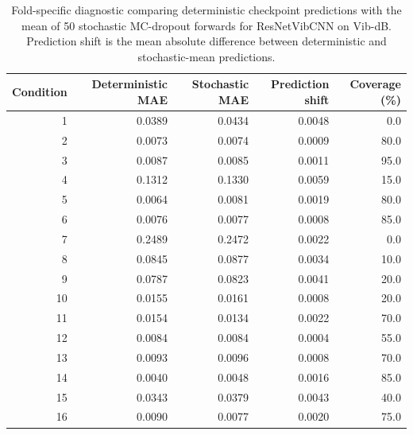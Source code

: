 \begin{table}[htbp]
\centering
\caption{Fold-specific diagnostic comparing deterministic checkpoint
predictions with the mean of 50 stochastic MC-dropout forwards for
ResNetVibCNN on Vib-dB. Prediction shift is the mean absolute difference
between deterministic and stochastic-mean predictions.}
\label{tab:supp-mcdropout-deterministic}
\begin{tabular}{@{}rrrrr@{}}
\toprule
Condition & Deterministic MAE & Stochastic MAE & Prediction shift & Coverage (\%) \\
\midrule
1 & 0.0389 & 0.0434 & 0.0048 & 0.0 \\
2 & 0.0073 & 0.0074 & 0.0009 & 80.0 \\
3 & 0.0087 & 0.0085 & 0.0011 & 95.0 \\
4 & 0.1312 & 0.1330 & 0.0059 & 15.0 \\
5 & 0.0064 & 0.0081 & 0.0019 & 80.0 \\
6 & 0.0076 & 0.0077 & 0.0008 & 85.0 \\
7 & 0.2489 & 0.2472 & 0.0022 & 0.0 \\
8 & 0.0845 & 0.0877 & 0.0034 & 10.0 \\
9 & 0.0787 & 0.0823 & 0.0041 & 20.0 \\
10 & 0.0155 & 0.0161 & 0.0008 & 20.0 \\
11 & 0.0154 & 0.0134 & 0.0022 & 70.0 \\
12 & 0.0084 & 0.0084 & 0.0004 & 55.0 \\
13 & 0.0093 & 0.0096 & 0.0008 & 70.0 \\
14 & 0.0040 & 0.0048 & 0.0016 & 85.0 \\
15 & 0.0343 & 0.0379 & 0.0043 & 40.0 \\
16 & 0.0090 & 0.0077 & 0.0020 & 75.0 \\
\bottomrule
\end{tabular}
\end{table}
